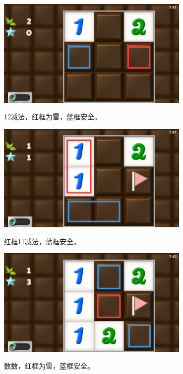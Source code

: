 \subsection{} %
\begin{center}
    \includegraphics[width=0.7\textwidth]{puzzle/10-1.png}
\end{center}
12减法，红框为雷，蓝框安全。
\begin{center}
    \includegraphics[width=0.7\textwidth]{puzzle/10-2.png}
\end{center}
红框11减法，蓝框安全。
\begin{center}
    \includegraphics[width=0.7\textwidth]{puzzle/10-3.png}
\end{center}
数数，红框为雷，蓝框安全。

